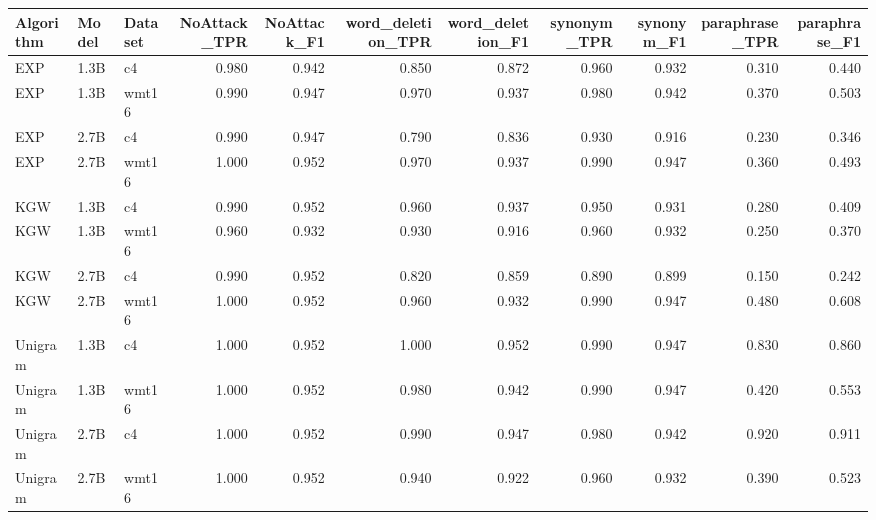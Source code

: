 \begin{tabular}{lllrrrrrrrr}
\toprule
Algorithm & Model & Dataset & NoAttack_TPR & NoAttack_F1 & word_deletion_TPR & word_deletion_F1 & synonym_TPR & synonym_F1 & paraphrase_TPR & paraphrase_F1 \\
\midrule
EXP & 1.3B & c4 & 0.980 & 0.942 & 0.850 & 0.872 & 0.960 & 0.932 & 0.310 & 0.440 \\
EXP & 1.3B & wmt16 & 0.990 & 0.947 & 0.970 & 0.937 & 0.980 & 0.942 & 0.370 & 0.503 \\
EXP & 2.7B & c4 & 0.990 & 0.947 & 0.790 & 0.836 & 0.930 & 0.916 & 0.230 & 0.346 \\
EXP & 2.7B & wmt16 & 1.000 & 0.952 & 0.970 & 0.937 & 0.990 & 0.947 & 0.360 & 0.493 \\
KGW & 1.3B & c4 & 0.990 & 0.952 & 0.960 & 0.937 & 0.950 & 0.931 & 0.280 & 0.409 \\
KGW & 1.3B & wmt16 & 0.960 & 0.932 & 0.930 & 0.916 & 0.960 & 0.932 & 0.250 & 0.370 \\
KGW & 2.7B & c4 & 0.990 & 0.952 & 0.820 & 0.859 & 0.890 & 0.899 & 0.150 & 0.242 \\
KGW & 2.7B & wmt16 & 1.000 & 0.952 & 0.960 & 0.932 & 0.990 & 0.947 & 0.480 & 0.608 \\
Unigram & 1.3B & c4 & 1.000 & 0.952 & 1.000 & 0.952 & 0.990 & 0.947 & 0.830 & 0.860 \\
Unigram & 1.3B & wmt16 & 1.000 & 0.952 & 0.980 & 0.942 & 0.990 & 0.947 & 0.420 & 0.553 \\
Unigram & 2.7B & c4 & 1.000 & 0.952 & 0.990 & 0.947 & 0.980 & 0.942 & 0.920 & 0.911 \\
Unigram & 2.7B & wmt16 & 1.000 & 0.952 & 0.940 & 0.922 & 0.960 & 0.932 & 0.390 & 0.523 \\
\bottomrule
\end{tabular}
